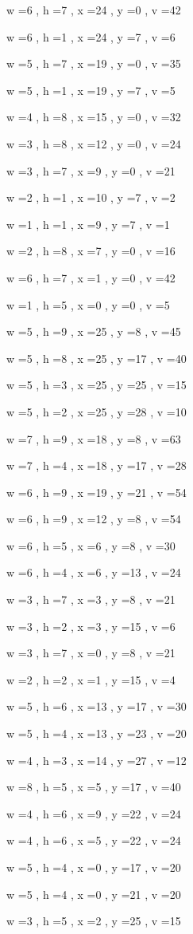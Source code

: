 \documentclass[11pt]{article}
\begin{document}
w =6 , h =7 , x =24 , y =0 , v =42
\par
w =6 , h =1 , x =24 , y =7 , v =6
\par
w =5 , h =7 , x =19 , y =0 , v =35
\par
w =5 , h =1 , x =19 , y =7 , v =5
\par
w =4 , h =8 , x =15 , y =0 , v =32
\par
w =3 , h =8 , x =12 , y =0 , v =24
\par
w =3 , h =7 , x =9 , y =0 , v =21
\par
w =2 , h =1 , x =10 , y =7 , v =2
\par
w =1 , h =1 , x =9 , y =7 , v =1
\par
w =2 , h =8 , x =7 , y =0 , v =16
\par
w =6 , h =7 , x =1 , y =0 , v =42
\par
w =1 , h =5 , x =0 , y =0 , v =5
\par
w =5 , h =9 , x =25 , y =8 , v =45
\par
w =5 , h =8 , x =25 , y =17 , v =40
\par
w =5 , h =3 , x =25 , y =25 , v =15
\par
w =5 , h =2 , x =25 , y =28 , v =10
\par
w =7 , h =9 , x =18 , y =8 , v =63
\par
w =7 , h =4 , x =18 , y =17 , v =28
\par
w =6 , h =9 , x =19 , y =21 , v =54
\par
w =6 , h =9 , x =12 , y =8 , v =54
\par
w =6 , h =5 , x =6 , y =8 , v =30
\par
w =6 , h =4 , x =6 , y =13 , v =24
\par
w =3 , h =7 , x =3 , y =8 , v =21
\par
w =3 , h =2 , x =3 , y =15 , v =6
\par
w =3 , h =7 , x =0 , y =8 , v =21
\par
w =2 , h =2 , x =1 , y =15 , v =4
\par
w =5 , h =6 , x =13 , y =17 , v =30
\par
w =5 , h =4 , x =13 , y =23 , v =20
\par
w =4 , h =3 , x =14 , y =27 , v =12
\par
w =8 , h =5 , x =5 , y =17 , v =40
\par
w =4 , h =6 , x =9 , y =22 , v =24
\par
w =4 , h =6 , x =5 , y =22 , v =24
\par
w =5 , h =4 , x =0 , y =17 , v =20
\par
w =5 , h =4 , x =0 , y =21 , v =20
\par
w =3 , h =5 , x =2 , y =25 , v =15
\par
\newpage
\end{document}
